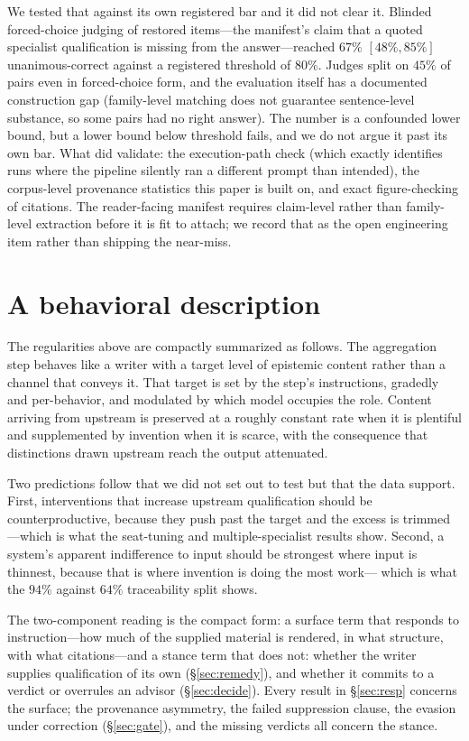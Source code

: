\documentclass[11pt]{article}
\begin{document}
We tested that against its own registered bar and it did not clear it.
Blinded forced-choice judging of restored items---the manifest's claim that
a quoted specialist qualification is missing from the answer---reached
$67\%$ $[48\%,85\%]$ unanimous-correct against a registered threshold of
$80\%$. Judges split on $45\%$ of pairs even in forced-choice form, and the
evaluation itself has a documented construction gap (family-level matching
does not guarantee sentence-level substance, so some pairs had no right
answer). The number is a confounded lower bound, but a lower bound below
threshold fails, and we do not argue it past its own bar. What did
validate: the execution-path check (which exactly identifies runs where the
pipeline silently ran a different prompt than intended), the corpus-level
provenance statistics this paper is built on, and exact figure-checking of
citations. The reader-facing manifest requires claim-level rather than
family-level extraction before it is fit to attach; we record that as the
open engineering item rather than shipping the near-miss.

\section{A behavioral description}
\label{sec:model}
The regularities above are compactly summarized as follows. The aggregation
step behaves like a writer with a target level of epistemic content rather
than a channel that conveys it. That target is set by the step's instructions,
gradedly and per-behavior, and modulated by which model occupies the role.
Content arriving from upstream is preserved at a roughly constant rate when it
is plentiful and supplemented by invention when it is scarce, with the
consequence that distinctions drawn upstream reach the output attenuated.

Two predictions follow that we did not set out to test but that the data
support. First, interventions that increase upstream qualification should be
counterproductive, because they push past the target and the excess is
trimmed---which is what the seat-tuning and multiple-specialist results show.
Second, a system's apparent indifference to input should be strongest where
input is thinnest, because that is where invention is doing the most work---
which is what the $94\%$ against $64\%$ traceability split shows.

The two-component reading is the compact form: a surface term that responds
to instruction---how much of the supplied material is rendered, in what
structure, with what citations---and a stance term that does not: whether
the writer supplies qualification of its own (\S\ref{sec:remedy}), and
whether it commits to a verdict or overrules an advisor
(\S\ref{sec:decide}). Every result in \S\ref{sec:resp} concerns the
surface; the provenance asymmetry, the failed suppression clause, the
evasion under correction (\S\ref{sec:gate}), and the missing verdicts all
concern the stance.
\end{document}
